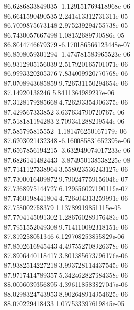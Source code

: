 {86.6286833849035 -1.129151769418968e-06 \\
86.6641590490535 2.241413312731311e-05 \\
86.7009875673148 2.975239294755738e-05 \\
86.7430057667498 1.08152689790586e-05 \\
86.8044746679379 -6.170186566123448e-07 \\
86.8508059301294 -1.474781583965523e-06 \\
86.9312905156039 2.517920165701071e-06 \\
86.9993320205376 7.834009920770768e-06 \\
87.0708943685859 9.726731150294654e-06 \\
87.14920138246 5.8411364989297e-06 \\
87.3128179285668 4.726293354906375e-06 \\
87.429567333852 3.637634790720767e-06 \\
87.518181194283 2.709341288209544e-06 \\
87.585795815552 -1.181476250167179e-06 \\
87.6203021432348 -6.160085831652395e-06 \\
87.6567856194215 -3.632949074017233e-06 \\
87.6826141482443 -3.874950138538225e-08 \\
87.7141127338964 3.558023536243127e-06 \\
87.7300016409872 9.790247759156046e-07 \\
87.7368975144727 6.129556027190119e-07 \\
87.7460198441804 4.726404313259991e-06 \\
87.758002758379 1.13789919851115e-05 \\
87.7704145091302 1.286760289076483e-05 \\
87.7951552049308 9.714110092318151e-06 \\
87.819258051346 6.129708253865829e-06 \\
87.8502616945443 4.497552708926378e-06 \\
87.8906440118417 3.801385673796176e-06 \\
87.9382514227218 3.993728114437545e-06 \\
87.9717414789357 5.342462827684358e-06 \\
88.0006039356895 4.396118583827047e-06 \\
88.0298324743953 8.902648914954625e-06 \\
88.070229418433 1.077533397619845e-05 \\
}
